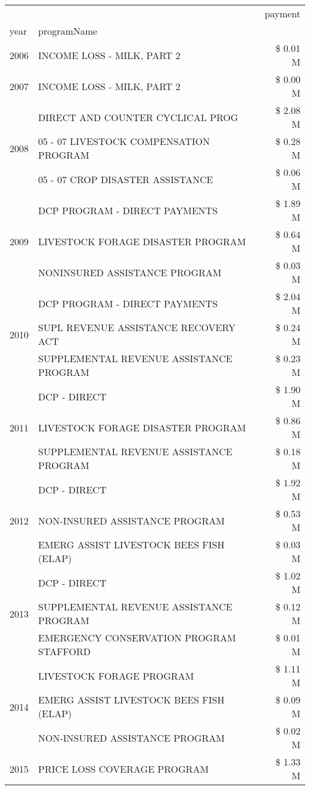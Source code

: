 \begin{tabular}{llr}
\toprule
 &  & payment \\
year & programName &  \\
\midrule
2006 & INCOME LOSS - MILK, PART 2 & \$ 0.01 M \\
\cline{1-3}
2007 & INCOME LOSS - MILK, PART 2 & \$ 0.00 M \\
\cline{1-3}
\multirow[t]{3}{*}{2008} & DIRECT AND COUNTER CYCLICAL PROG & \$ 2.08 M \\
 & 05 - 07 LIVESTOCK COMPENSATION PROGRAM & \$ 0.28 M \\
 & 05 - 07 CROP DISASTER ASSISTANCE & \$ 0.06 M \\
\cline{1-3}
\multirow[t]{3}{*}{2009} & DCP PROGRAM - DIRECT PAYMENTS & \$ 1.89 M \\
 & LIVESTOCK FORAGE DISASTER  PROGRAM & \$ 0.64 M \\
 & NONINSURED ASSISTANCE PROGRAM & \$ 0.03 M \\
\cline{1-3}
\multirow[t]{3}{*}{2010} & DCP PROGRAM - DIRECT PAYMENTS & \$ 2.04 M \\
 & SUPL REVENUE ASSISTANCE RECOVERY ACT & \$ 0.24 M \\
 & SUPPLEMENTAL REVENUE ASSISTANCE PROGRAM & \$ 0.23 M \\
\cline{1-3}
\multirow[t]{3}{*}{2011} & DCP - DIRECT & \$ 1.90 M \\
 & LIVESTOCK FORAGE DISASTER PROGRAM & \$ 0.86 M \\
 & SUPPLEMENTAL REVENUE ASSISTANCE PROGRAM & \$ 0.18 M \\
\cline{1-3}
\multirow[t]{3}{*}{2012} & DCP - DIRECT & \$ 1.92 M \\
 & NON-INSURED ASSISTANCE PROGRAM & \$ 0.53 M \\
 & EMERG ASSIST LIVESTOCK BEES FISH (ELAP) & \$ 0.03 M \\
\cline{1-3}
\multirow[t]{3}{*}{2013} & DCP - DIRECT & \$ 1.02 M \\
 & SUPPLEMENTAL REVENUE ASSISTANCE PROGRAM & \$ 0.12 M \\
 & EMERGENCY CONSERVATION PROGRAM STAFFORD & \$ 0.01 M \\
\cline{1-3}
\multirow[t]{3}{*}{2014} & LIVESTOCK FORAGE PROGRAM & \$ 1.11 M \\
 & EMERG ASSIST LIVESTOCK BEES FISH (ELAP) & \$ 0.09 M \\
 & NON-INSURED ASSISTANCE PROGRAM & \$ 0.02 M \\
\cline{1-3}
\multirow[t]{3}{*}{2015} & PRICE LOSS COVERAGE PROGRAM & \$ 1.33 M \\

\end{tabular}
